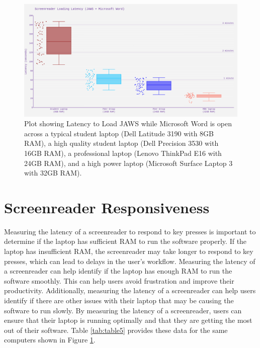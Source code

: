 \documentclass[12pt,letterpaper,twoside,openright]{report}
\begin{document}
\begin{figure}[H]
	\centering
	\includegraphics[width=\textwidth]{images/ComputerRBDisplaySpecsTVIFig1.png}

	\caption[Latency to Load JAWS]{Plot showing Latency to Load JAWS while Microsoft Word is open across a typical student laptop (Dell Latitude 3190 with 8GB RAM), a high quality student laptop (Dell Precision 3530 with 16GB RAM), a professional laptop (Lenovo ThinkPad E16 with 24GB RAM), and a high power laptop (Microsoft Surface Laptop 3 with 32GB RAM).}\label{fig:figure 1}
\end{figure}

\pagebreak
\hypertarget{screenreader-response}{}\section{Screenreader Responsiveness}\label{screenreader-response}
Measuring the latency of a screenreader to respond to key presses is important to determine if the laptop has sufficient RAM to run the software properly. If the laptop has insufficient RAM, the screenreader may take longer to respond to key presses, which can lead to delays in the user’s workflow. Measuring the latency of a screenreader can help identify if the laptop has enough RAM to run the software smoothly. This can help users avoid frustration and improve their productivity. Additionally, measuring the latency of a screenreader can help users identify if there are other issues with their laptop that may be causing the software to run slowly. By measuring the latency of a screenreader, users can ensure that their laptop is running optimally and that they are getting the most out of their software. Table \ref{tab:table5} provides these data for the same computers shown in Figure \ref{fig:figure 1}.
\end{document}
